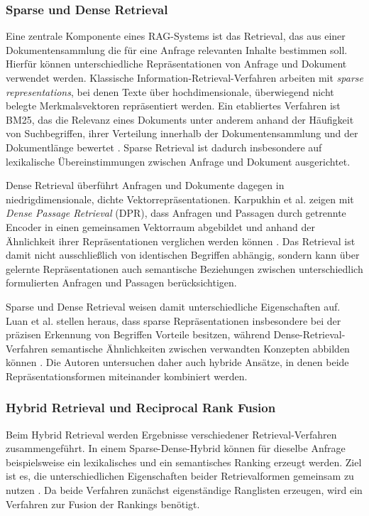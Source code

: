 \subsubsection{Sparse und Dense Retrieval}
\label{subsubsec:sparse_dense}
 
Eine zentrale Komponente eines RAG-Systems ist das Retrieval, das aus einer Dokumentensammlung die für eine Anfrage relevanten Inhalte bestimmen soll. Hierfür können unterschiedliche Repräsentationen von Anfrage und Dokument verwendet werden. Klassische Information-Retrieval-Verfahren arbeiten mit \textit{sparse representations}, bei denen Texte über hochdimensionale, überwiegend nicht belegte Merkmalsvektoren repräsentiert werden. Ein etabliertes Verfahren ist BM25, das die Relevanz eines Dokuments unter anderem anhand der Häufigkeit von Suchbegriffen, ihrer Verteilung innerhalb der Dokumentensammlung und der Dokumentlänge bewertet \cite{RobertsonZaragoza2009}. Sparse Retrieval ist dadurch insbesondere auf lexikalische Übereinstimmungen zwischen Anfrage und Dokument ausgerichtet.
 
Dense Retrieval überführt Anfragen und Dokumente dagegen in niedrigdimensionale, dichte Vektorrepräsentationen. Karpukhin et al. zeigen mit \textit{Dense Passage Retrieval} (DPR), dass Anfragen und Passagen durch getrennte Encoder in einen gemeinsamen Vektorraum abgebildet und anhand der Ähnlichkeit ihrer Repräsentationen verglichen werden können \cite{Karpukhin2020DPR}. Das Retrieval ist damit nicht ausschließlich von identischen Begriffen abhängig, sondern kann über gelernte Repräsentationen auch semantische Beziehungen zwischen unterschiedlich formulierten Anfragen und Passagen berücksichtigen.
 
Sparse und Dense Retrieval weisen damit unterschiedliche Eigenschaften auf. Luan et al. stellen heraus, dass sparse Repräsentationen insbesondere bei der präzisen Erkennung von Begriffen Vorteile besitzen, während Dense-Retrieval-Verfahren semantische Ähnlichkeiten zwischen verwandten Konzepten abbilden können \cite{Luan2021SparseDense}. Die Autoren untersuchen daher auch hybride Ansätze, in denen beide Repräsentationsformen miteinander kombiniert werden.
 
\subsubsection{Hybrid Retrieval und Reciprocal Rank Fusion}
\label{subsubsec:hybrid_rrf}
 
Beim Hybrid Retrieval werden Ergebnisse verschiedener Retrieval-Verfahren zusammengeführt. In einem Sparse-Dense-Hybrid können für dieselbe Anfrage beispielsweise ein lexikalisches und ein semantisches Ranking erzeugt werden. Ziel ist es, die unterschiedlichen Eigenschaften beider Retrievalformen gemeinsam zu nutzen \cite{Luan2021SparseDense}. Da beide Verfahren zunächst eigenständige Ranglisten erzeugen, wird ein Verfahren zur Fusion der Rankings benötigt.
 
